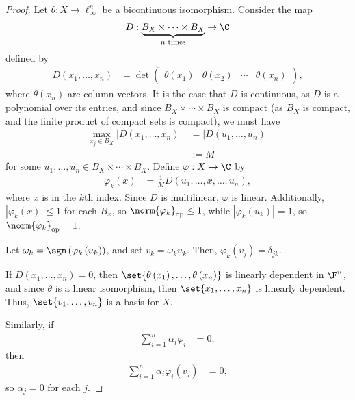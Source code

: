 \documentclass[10pt]{mypackage}
\begin{document}
\begin{proof}
  Let $\theta: X\rightarrow \ell_{\infty}^{n}$ be a bicontinuous isomorphism. Consider the map
  \begin{align*}
    D: \underbrace{B_{X}\times\cdots\times B_X}_{\text{$n$ times}}\rightarrow \C
  \end{align*}
  defined by
  \begin{align*}
    D\left(x_1,\dots,x_n\right) &= \det \begin{pmatrix}\theta\left(x_1\right) & \theta\left(x_2\right) & \cdots & \theta\left(x_n\right)\end{pmatrix},
  \end{align*}
  where $\theta\left(x_n\right)$ are column vectors. It is the case that $D$ is continuous, as $D$ is a polynomial over its entries, and since $B_X\times\cdots\times B_X$ is compact (as $B_X$ is compact, and the finite product of compact sets is compact), we must have
  \begin{align*}
    \max_{x_j\in B_X}\left\vert D\left(x_1,\dots,x_n\right) \right\vert &= \left\vert D\left(u_1,\dots,u_n\right) \right\vert\\
                                                                        &:= M
  \end{align*}
  for some $u_1,\dots,u_n\in B_X\times\cdots\times B_X$. Define $\varphi: X\rightarrow \C$ by
  \begin{align*}
    \varphi_k\left(x\right) &= \frac{1}{M}D\left(u_1,\dots,x,\dots,u_n\right),
  \end{align*}
  where $x$ is in the $k$th index. Since $D$ is multilinear, $\varphi$ is linear. Additionally, $\left\vert \varphi_k(x) \right\vert\leq 1$ for each $B_x$, so $\norm{\varphi_k}_{\text{op}} \leq 1$, while $\left\vert \varphi_k\left(u_k\right) \right\vert = 1$, so $\norm{\varphi_k}_{\text{op}} =1 $.\newline

  Let $\omega_k = \sgn\left(\varphi_k\left(u_k\right)\right)$, and set $v_k = \omega_ku_k$. Then, $\varphi_k\left(v_j\right) = \delta_{jk}$.\newline

  If $D\left(x_1,\dots,x_n\right) = 0$, then $\set{\theta\left(x_1\right),\dots,\theta\left(x_n\right)}$ is linearly dependent in $\F^n$, and since $\theta$ is a linear isomorphism, then $\set{x_1,\dots,x_n}$ is linearly dependent. Thus, $\set{v_1,\dots,v_n}$ is a basis for $X$.\newline

  Similarly, if
  \begin{align*}
    \sum_{i=1}^{n}\alpha_i\varphi_{i} &= 0,
  \end{align*}
  then
  \begin{align*}
    \sum_{i=1}^{n}\alpha_{i}\varphi_{i}\left(v_j\right) &= 0,
  \end{align*}
  so $\alpha_j = 0$ for each $j$.
  


\end{proof}
\end{document}
